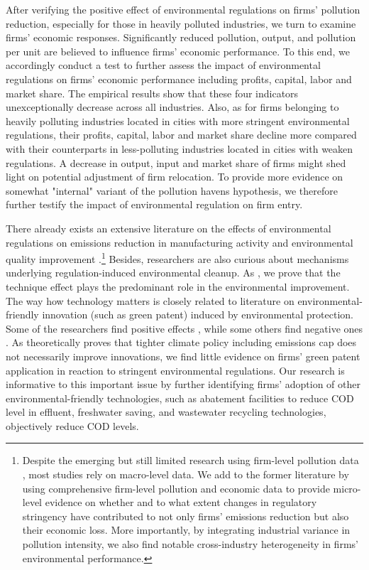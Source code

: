 \documentclass[12pt,english]{article}
\begin{document}
After verifying the positive effect of environmental regulations on firms’ pollution reduction, especially for those in heavily polluted industries, we turn to examine firms’ economic responses. Significantly reduced pollution, output, and pollution per unit are believed to influence firms’ economic performance. To this end, we accordingly conduct a test to further assess the impact of environmental regulations on firms' economic performance including profits, capital, labor and market share. The empirical results show that these four indicators unexceptionally decrease across all industries. Also, as for firms belonging to heavily polluting industries located in cities with more stringent environmental regulations, their profits, capital, labor and market share decline more compared with their counterparts in less-polluting industries located in cities with weaken regulations. A decrease in output, input and market share of firms might shed light on potential adjustment of firm relocation. To provide more evidence on somewhat "internal" variant of the pollution havens hypothesis, we therefore further testify the impact of environmental regulation on firm entry.

There already exists an extensive literature on the effects of environmental regulations on emissions reduction in manufacturing activity and environmental quality improvement \citep*{nelson1993differential,chay2005does,greenstone2014environmental}.\footnote{Despite the emerging but still limited research using firm-level pollution data \citep*{martin2011energy,zhang2018does}, most studies rely on macro-level data. We add to the former literature by using comprehensive firm-level pollution and economic data to provide micro-level evidence on whether and to what extent changes in regulatory stringency have contributed to not only firms' emissions reduction but also their economic loss. More importantly, by integrating industrial variance in pollution intensity, we also find notable cross-industry heterogeneity in firms' environmental performance.} Besides, researchers are also curious about mechanisms underlying regulation-induced environmental cleanup. As \citet*{levinson2009technology}, we prove that the technique effect plays the predominant role in the environmental improvement. The way how technology matters is closely related to literature on environmental-friendly innovation (such as green patent) induced by environmental protection. Some of the researchers find positive effects \citep*{acemoglu2016transition,aghion2016carbon,gutierrez2018abatement,aghion2019environmental}, while some others find negative ones \citep*{nelson1993differential,gray1998environmental,gans2012innovation}. As \citet*{gutierrez2018abatement} theoretically proves that tighter climate policy including emissions cap does not necessarily improve innovations, we find little evidence on firms' green patent application in reaction to stringent environmental regulations. Our research is informative to this important issue by further identifying firms' adoption of other environmental-friendly technologies, such as abatement facilities to reduce COD level in effluent, freshwater saving, and wastewater recycling technologies, objectively reduce COD levels.
\end{document}
